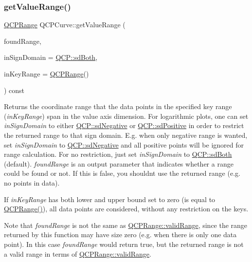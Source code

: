 \subsubsection{\texorpdfstring{get\+Value\+Range()}{getValueRange()}}
{\footnotesize\ttfamily \hyperlink{class_q_c_p_range}{Q\+C\+P\+Range} Q\+C\+P\+Curve\+::get\+Value\+Range (\begin{DoxyParamCaption}\item[{bool \&}]{found\+Range,  }\item[{\hyperlink{namespace_q_c_p_afd50e7cf431af385614987d8553ff8a9}{Q\+C\+P\+::\+Sign\+Domain}}]{in\+Sign\+Domain = {\ttfamily \hyperlink{namespace_q_c_p_afd50e7cf431af385614987d8553ff8a9aa38352ef02d51ddfa4399d9551566e24}{Q\+C\+P\+::sd\+Both}},  }\item[{const \hyperlink{class_q_c_p_range}{Q\+C\+P\+Range} \&}]{in\+Key\+Range = {\ttfamily \hyperlink{class_q_c_p_range}{Q\+C\+P\+Range}()} }\end{DoxyParamCaption}) const\hspace{0.3cm}{\ttfamily [virtual]}}

Returns the coordinate range that the data points in the specified key range ({\itshape in\+Key\+Range}) span in the value axis dimension. For logarithmic plots, one can set {\itshape in\+Sign\+Domain} to either \hyperlink{namespace_q_c_p_afd50e7cf431af385614987d8553ff8a9a2d18af0bc58f6528d1e82ce699fe4829}{Q\+C\+P\+::sd\+Negative} or \hyperlink{namespace_q_c_p_afd50e7cf431af385614987d8553ff8a9a584784b75fb816abcc627cf743bb699f}{Q\+C\+P\+::sd\+Positive} in order to restrict the returned range to that sign domain. E.\+g. when only negative range is wanted, set {\itshape in\+Sign\+Domain} to \hyperlink{namespace_q_c_p_afd50e7cf431af385614987d8553ff8a9a2d18af0bc58f6528d1e82ce699fe4829}{Q\+C\+P\+::sd\+Negative} and all positive points will be ignored for range calculation. For no restriction, just set {\itshape in\+Sign\+Domain} to \hyperlink{namespace_q_c_p_afd50e7cf431af385614987d8553ff8a9aa38352ef02d51ddfa4399d9551566e24}{Q\+C\+P\+::sd\+Both} (default). {\itshape found\+Range} is an output parameter that indicates whether a range could be found or not. If this is false, you shouldn\textquotesingle{}t use the returned range (e.\+g. no points in data).

If {\itshape in\+Key\+Range} has both lower and upper bound set to zero (is equal to {\ttfamily \hyperlink{class_q_c_p_range}{Q\+C\+P\+Range()}}), all data points are considered, without any restriction on the keys.

Note that {\itshape found\+Range} is not the same as \hyperlink{class_q_c_p_range_ab38bd4841c77c7bb86c9eea0f142dcc0}{Q\+C\+P\+Range\+::valid\+Range}, since the range returned by this function may have size zero (e.\+g. when there is only one data point). In this case {\itshape found\+Range} would return true, but the returned range is not a valid range in terms of \hyperlink{class_q_c_p_range_ab38bd4841c77c7bb86c9eea0f142dcc0}{Q\+C\+P\+Range\+::valid\+Range}.

